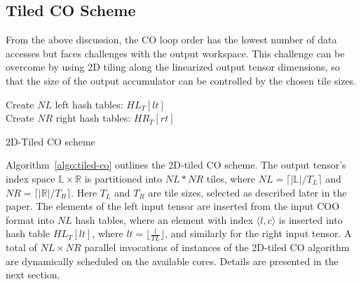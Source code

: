 
\subsection{Tiled CO Scheme}
From the above discussion, the CO loop order has the lowest number of data accesses but faces challenges with the output workspace. This challenge can be overcome by using 2D tiling along the linearized output tensor dimensions, so that the size of the output accumulator can be controlled by the chosen tile sizes.
\begin{algorithm}[h]
\DontPrintSemicolon
\LinesNumbered
Create $\mathit{NL}$ left hash tables: $\mathit{HL_T[lt]}$\\
Create $\mathit{NR}$ right hash tables: $\mathit{HR_T[rt]}$\\

\caption{2D-Tiled CO scheme\label{algo:tiled-co}}
\end{algorithm}

Algorithm~\ref{algo:tiled-co} outlines the 2D-tiled CO scheme. The output tensor's index space $\mathbb{L} \times \mathbb{R}$ is partitioned into ${\mathit{NL} \ast \mathit{NR}}$ tiles, where $\mathit{NL} = \lceil|\mathbb{L}| / \mathit{T_L} \rceil$ and $\mathit{NR} = \lceil|\mathbb{R}| / \mathit{T_R} \rceil$.
Here $\mathit{T_L}$ and $\mathit{T_R}$ are tile sizes, selected as described later in the paper.
The elements of the left input tensor are inserted from the input COO format into $\mathit{NL}$ hash tables, where an element with index $\langle l,c\rangle$ is inserted into hash table $\mathit{HL_T[lt]}$, where $\mathit{lt} = \lfloor \frac{l}{\mathit{TL}}\rfloor$, and similarly for the right input tensor. A total of ${\mathit{NL} \times \mathit{NR}}$ parallel invocations of instances of the 2D-tiled CO algorithm are dynamically scheduled on the available cores. Details are presented in the next section.
